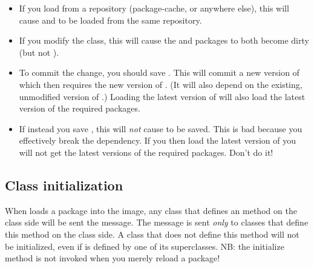 \documentclass[a4paper,10pt,twoside]{book}
\begin{document}
\begin{itemize}
\item If you load  from a repository (package-cache, or anywhere else), this will cause  and  to be loaded from the same repository.
\item If you modify the  class, this will cause the  and  packages to both become dirty (but not ).
\item To commit the change, you should save . This will commit a new version of  which then requires the new version of . (It will also depend on the existing, unmodified version of .)  Loading the latest version of  will also load the latest version of the required packages.
\item If instead you save , this will \emph{not} cause  to be saved.  This is bad because you effectively break the dependency.  If you then load the latest version of  you will not get the latest versions of the required packages. Don't do it!
\end{itemize}

\subsection{Class initialization}

When \MC loads a package into the image, any class that defines an  method on the class side will be sent the  message. The message is sent \emph{only} to classes that define this method on the class side. A class that does not define this method will not be initialized, even if  is defined by one of its superclasses. NB: the initialize method is not invoked when you merely reload a package!
\end{document}
